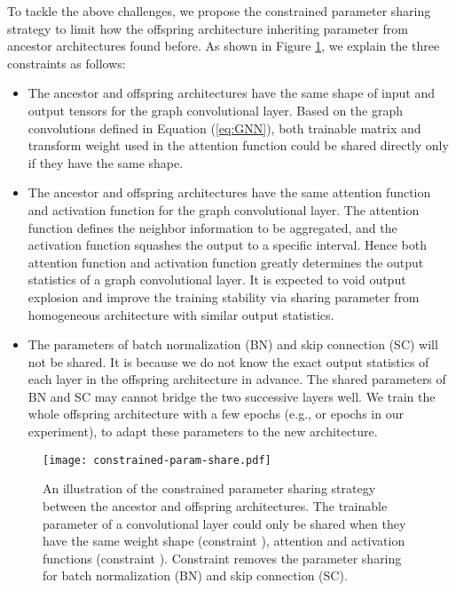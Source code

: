 \documentclass[sigconf]{acmart}
\begin{document}
To tackle the above challenges, we propose the constrained parameter sharing strategy to limit how the offspring architecture inheriting parameter from ancestor architectures found before. 
As shown in Figure \ref{fig:param-share}, we explain the three constraints as follows:
\begin{itemize}
    \item The ancestor and offspring architectures have the same shape of input and output tensors for the graph convolutional layer. Based on the graph convolutions defined in Equation (\ref{eq:GNN}), both trainable matrix  and transform weight used in the attention function could be shared directly only if they have the same shape. 
    \item The ancestor and offspring architectures have the same attention function and activation function for the graph convolutional layer. The attention function defines the neighbor information to be aggregated, and the activation function squashes the output to a specific interval. Hence both attention function and activation function greatly determines the output statistics of a graph convolutional layer. It is expected to void output explosion and improve the training stability via sharing parameter from homogeneous architecture with similar output statistics. 
\item The parameters of batch normalization (BN) and skip connection (SC) will not be shared. It is because we do not know the exact output statistics of each layer in the offspring architecture in advance. The shared parameters of BN and SC may cannot bridge the two successive layers well. We train the whole offspring architecture with a few epochs (e.g.,  or  epochs in our experiment), to adapt these parameters to the new architecture. 
\end{itemize}

\begin{figure}
    \centering
    \texttt{[image: constrained-param-share.pdf]}\\
    \vspace{-10pt}
    \caption{An illustration of the constrained parameter sharing strategy between the ancestor and offspring architectures. The trainable parameter of a convolutional layer could only be shared when they have the same weight shape (constraint ), attention and activation functions (constraint ). Constraint  removes the parameter sharing for batch normalization (BN) and skip connection (SC).}
    \label{fig:param-share}
\end{figure}
\end{document}
